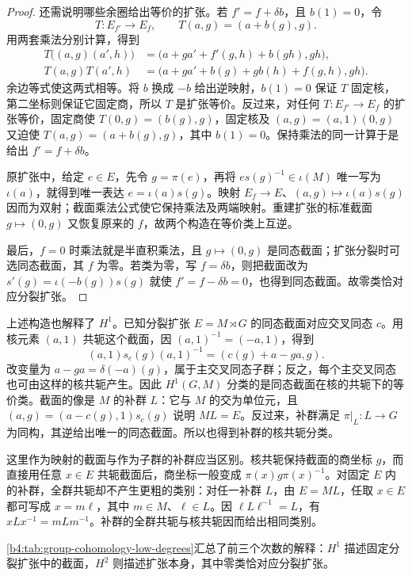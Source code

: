 \begin{proof}
	还需说明哪些余圈给出等价的扩张。若 \(f'=f+\delta b\)，且 \(b(1)=0\)，令
	\[
		T:E_{f'}\longrightarrow E_f,\qquad T(a,g)=(a+b(g),g).
	\]
	用两套乘法分别计算，得到
	\[
		\begin{aligned}
			T\bigl((a,g)(a',h)\bigr) &=\bigl(a+ga'+f'(g,h)+b(gh),gh\bigr),\\
			T(a,g)T(a',h) &=\bigl(a+ga'+b(g)+g b(h)+f(g,h),gh\bigr).
		\end{aligned}
	\]
	余边等式使这两式相等。将 \(b\) 换成 \(-b\) 给出逆映射，\(b(1)=0\) 保证 \(T\) 固定核，第二坐标则保证它固定商，所以 \(T\) 是扩张等价。反过来，对任何 \(T:E_{f'}\to E_f\) 的扩张等价，固定商使 \(T(0,g)=(b(g),g)\)，固定核及 \((a,g)=(a,1)(0,g)\) 又迫使 \(T(a,g)=(a+b(g),g)\)，其中 \(b(1)=0\)。保持乘法的同一计算于是给出 \(f'=f+\delta b\)。

	原扩张中，给定 \(e\in E\)，先令 \(g=\pi(e)\)，再将 \(es(g)^{-1}\in\iota(M)\) 唯一写为 \(\iota(a)\)，就得到唯一表达 \(e=\iota(a)s(g)\)。映射 \(E_f\to E\)、\((a,g)\mapsto\iota(a)s(g)\) 因而为双射；截面乘法公式使它保持乘法及两端映射。重建扩张的标准截面 \(g\mapsto(0,g)\) 又恢复原来的 \(f\)，故两个构造在等价类上互逆。

	最后，\(f=0\) 时乘法就是半直积乘法，且 \(g\mapsto(0,g)\) 是同态截面；扩张分裂时可选同态截面，其 \(f\) 为零。若类为零，写 \(f=\delta b\)，则把截面改为 \(s'(g)=\iota(-b(g))s(g)\) 就使 \(f'=f-\delta b=0\)，也得到同态截面。故零类恰对应分裂扩张。
\end{proof}

上述构造也解释了 \(H^1\)。已知分裂扩张 \(E=M\rtimes G\) 的同态截面对应交叉同态 \(c\)。用核元素 \((a,1)\) 共轭这个截面，因 \((a,1)^{-1}=(-a,1)\)，得到
\[
	(a,1)s_c(g)(a,1)^{-1}=(c(g)+a-ga,g).
\]
改变量为 \(a-ga=\delta(-a)(g)\)，属于主交叉同态子群；反之，每个主交叉同态也可由这样的核共轭产生。因此 \(H^1(G,M)\) 分类的是同态截面在核的共轭下的等价类。截面的像是 \(M\) 的补群 \(L\)：它与 \(M\) 的交为单位元，且 \((a,g)=(a-c(g),1)s_c(g)\) 说明 \(ML=E\)。反过来，补群满足 \(\pi|_L:L\to G\) 为同构，其逆给出唯一的同态截面。所以也得到补群的核共轭分类。

\ProseParagraphBreak
这里作为映射的截面与作为子群的补群应当区别。核共轭保持截面的商坐标 \(g\)，而直接用任意 \(x\in E\) 共轭截面后，商坐标一般变成 \(\pi(x)g\pi(x)^{-1}\)。对固定 \(E\) 内的补群，全群共轭却不产生更粗的类别：对任一补群 \(L\)，由 \(E=ML\)，任取 \(x\in E\) 都可写成 \(x=m\ell\)，其中 \(m\in M\)、\(\ell\in L\)。因 \(\ell L\ell^{-1}=L\)，有 \(xLx^{-1}=mLm^{-1}\)。补群的全群共轭与核共轭因而给出相同类别。

\ProseParagraphBreak
\cref{b4:tab:group-cohomology-low-degrees}汇总了前三个次数的解释：\(H^1\) 描述固定分裂扩张中的截面，\(H^2\) 则描述扩张本身，其中零类恰对应分裂扩张。



